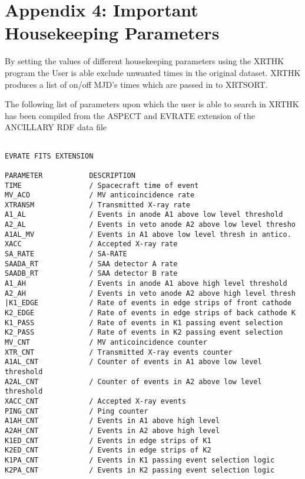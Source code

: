 \documentclass[11pt,fleqn]{article}    %
\begin{document}
\newpage
\section{Appendix 4: Important Housekeeping Parameters}

By setting the values of  different housekeeping parameters using the XRTHK program
the User  is  able exclude unwanted times  in  the original dataset.  XRTHK
produces a list of on/off MJD's times which are passed in to XRTSORT. 

The following list of parameters upon which the user is able to search in XRTHK
has been compiled from the ASPECT and EVRATE  extension of the ANCILLARY RDF
data file
 
\begin{verbatim}

EVRATE FITS EXTENSION

PARAMETER           DESCRIPTION
TIME                / Spacecraft time of event
MV_ACO              / MV anticoincidence rate       
XTRANSM             / Transmitted X-ray rate  
A1_AL               / Events in anode A1 above low level threshold       
A2_AL               / Events in veto anode A2 above low level thresho        
A1AL_MV             / Events in A1 above low level thresh in antico.
XACC                / Accepted X-ray rate         
SA_RATE             / SA-RATE    
SAADA_RT            / SAA detector A rate   
SAADB_RT            / SAA detector B rate   
A1_AH               / Events in anode A1 above high level threshold      
A2_AH               / Events in veto anode A2 above high level thresh 
|K1_EDGE            / Rate of events in edge strips of front cathode     
K2_EDGE             / Rate of events in edge strips of back cathode K   
K1_PASS             / Rate of events in K1 passing event selection  
K2_PASS             / Rate of events in K2 passing event selection   
MV_CNT              / MV anticoincidence counter
XTR_CNT             / Transmitted X-ray events counter
A1AL_CNT            / Counter of events in A1 above low level threshold
A2AL_CNT            / Counter of events in A2 above low level threshold
XACC_CNT            / Accepted X-ray events
PING_CNT            / Ping counter
A1AH_CNT            / Events in A1 above high level
A2AH_CNT            / Events in A2 above high level
K1ED_CNT            / Events in edge strips of K1
K2ED_CNT            / Events in edge strips of K2
K1PA_CNT            / Events in K1 passing event selection logic
K2PA_CNT            / Events in K2 passing event selection logic  


\end{verbatim}
\end{document}
